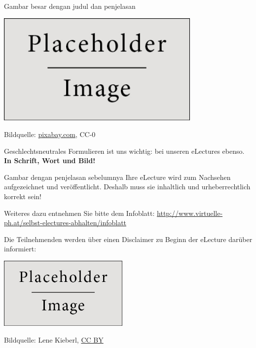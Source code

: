 \documentclass{beamer}
\begin{document}
\begin{frame}{Gambar besar dengan judul dan penjelasan}
	\begin{center}
		\includegraphics[height=5.5cm]{figures/placeholder}

		{\tiny \textcolor{digiPH_darkorange}{Bildquelle: \url{pixabay.com}, CC-0}}
	\end{center}
	\begin{center}
		Geschlechtsneutrales Formulieren ist uns wichtig: bei unseren eLectures ebenso. \textbf{In Schrift, Wort und Bild!}
	\end{center}
\end{frame}


\begin{frame}{Gambar dengan penjelasan sebelumnya}
	\small Ihre eLecture wird zum Nachsehen aufgezeichnet und veröffentlicht. Deshalb muss sie inhaltlich und urheberrechtlich korrekt sein!

	\tiny Weiteres dazu entnehmen Sie bitte dem Infoblatt: \url{http://www.virtuelle-ph.at/selbst-electures-abhalten/infoblatt}

	\small Die Teilnehmenden werden über einen Disclaimer zu Beginn der eLecture darüber informiert:

	\begin{center}
		\includegraphics[height=3.5cm]{figures/placeholder}

		{\tiny \textcolor{digiPH_darkorange}{Bildquelle: Lene Kieberl, \href{https://creativecommons.org/licenses/by/3.0/at/}{CC BY}}}
	\end{center}
\end{frame}
\end{document}
